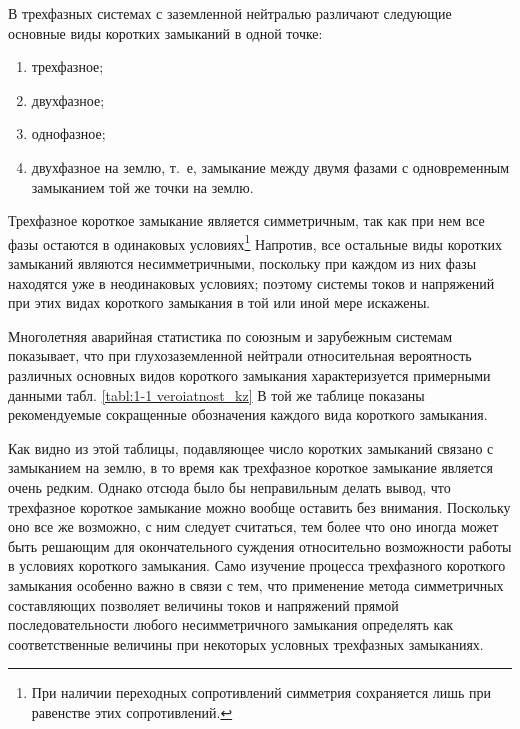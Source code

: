 В трехфазных системах с заземленной нейтралью различают следующие основные виды коротких замыканий в одной точке:

\begin{enumerate} 
	\item
	трехфазное;
	\item
	двухфазное;
	\item
	однофазное;
	\item
	двухфазное на землю, т.~е, замыкание между двумя фазами с одновременным замыканием той же точки на землю. 
\end{enumerate}

Трехфазное короткое замыкание является симметричным, так как при нем все фазы остаются в одинаковых условиях\footnote{При наличии переходных сопротивлений симметрия сохраняется лишь при равенстве этих сопротивлений.} Напротив, все остальные виды коротких замыканий являются несимметричными, поскольку при каждом из них фазы находятся уже в неодинаковых условиях; поэтому системы токов и напряжений при этих видах короткого замыкания в той или иной мере искажены.
	
Многолетняя аварийная статистика по союзным и зарубежным системам показывает, что при глухозаземленной нейтрали относительная вероятность различных основных видов короткого замыкания характеризуется примерными данными табл. \ref{tabl:1-1 veroiatnost_kz} В той же таблице показаны рекомендуемые сокращенные обозначения каждого вида короткого замыкания.

Как видно из этой таблицы, подавляющее число коротких замыканий связано с замыканием на землю, в то время как трехфазное короткое замыкание является очень редким. Однако отсюда было бы неправильным делать вывод, что трехфазное короткое замыкание можно вообще оставить без внимания. Поскольку оно все же возможно, с ним следует считаться, тем более что оно иногда может быть решающим для окончательного суждения относительно возможности работы в условиях короткого замыкания. Само изучение процесса трехфазного короткого замыкания особенно важно в связи с тем, что применение метода симметричных составляющих позволяет величины токов и напряжений прямой последовательности любого несимметричного замыкания определять как соответственные величины при некоторых условных трехфазных замыканиях.

